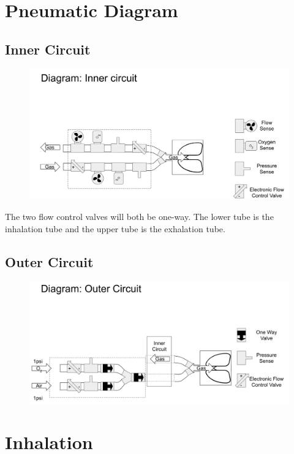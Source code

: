 \documentclass{article}
\begin{document}
\section{Pneumatic Diagram}
\subsection{Inner Circuit}
\begin{figure}[h]
\centering
\includegraphics[scale=0.25]{pneumatic-diagram-inner.png}
\end{figure}

The two flow control valves will both be one-way. The lower tube is the inhalation tube and the upper tube is the exhalation tube.

\subsection{Outer Circuit}
\begin{figure}[h]
\centering
\includegraphics[scale=0.25]{pneumatic-diagram-outer.png}
\end{figure}

\newpage

\section{Inhalation}
\end{document}
